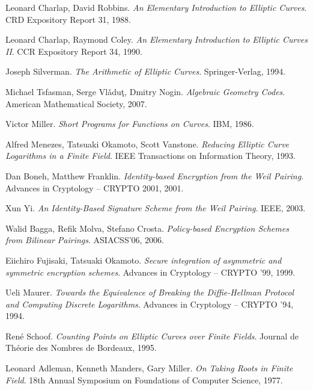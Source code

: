 \begin{thebibliography}{99}

    Leonard Charlap, David Robbins.
    \emph{An Elementary Introduction to Elliptic Curves}.
    CRD Expository Report 31, 1988.

    Leonard Charlap, Raymond Coley.
    \emph{An Elementary Introduction to Elliptic Curves II}.
    CCR Expository Report 34, 1990.

    Joseph Silverman.
    \emph{The Arithmetic of Elliptic Curves}.
    Springer-Verlag, 1994.

    Michael Tsfasman, Serge  Vl\v{a}du\c{t}, Dmitry Nogin.
    \emph{Algebraic Geometry Codes}.
    American Mathematical Society, 2007.

    Victor Miller.
    \emph{Short Programs for Functions on Curves}.
    IBM, 1986.

    Alfred Menezes, Tatsuaki Okamoto, Scott Vanstone.
    \emph{Reducing Elliptic Curve Logarithms in a Finite Field}.
    IEEE Transactions on Information Theory, 1993.

    Dan Boneh, Matthew Franklin.
    \emph{Identity-based Encryption from the Weil Pairing}.
    Advances in Cryptology -- CRYPTO 2001, 2001.

    Xun Yi.
    \emph{An Identity-Based Signature Scheme from the Weil Pairing}.
    IEEE, 2003.

    Walid Bagga, Refik Molva, Stefano Crosta.
    \emph{Policy-based Encryption Schemes from Bilinear Pairings}.
    ASIACSS'06, 2006.

    Eiichiro Fujisaki, Tatsuaki Okamoto.
    \emph{Secure integration of asymmetric and symmetric encryption schemes}.
    Advances in Cryptology -- CRYPTO '99, 1999.

    Ueli Maurer.
    \emph{Towards the Equivalence of Breaking the Diffie-Hellman Protocol
        and Computing Discrete Logarithms}.
    Advances in Cryptology -- CRYPTO '94, 1994.

    René Schoof.
    \emph{Counting Points on Elliptic Curves over Finite Fields}.
    Journal de Théorie des Nombres de Bordeaux, 1995.

    Leonard Adleman, Kenneth Manders, Gary Miller.
    \emph{On Taking Roots in Finite Field}.
    18th Annual Symposium on Foundations of Computer Science, 1977.


\end{thebibliography}
